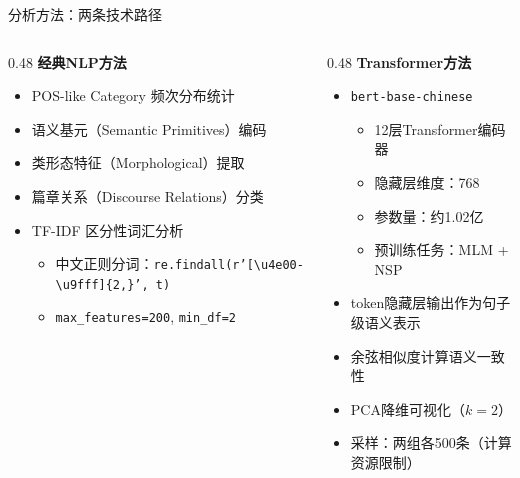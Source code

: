 \documentclass[aspectratio=169,xcolor=x11names,compress]{ctexbeamer}
\begin{document}
\begin{frame}{分析方法：两条技术路径}
\begin{columns}
\begin{column}{0.48\textwidth}
\textbf{经典NLP方法}
\begin{itemize}
    \item POS-like Category 频次分布统计
    \item 语义基元（Semantic Primitives）编码
    \item 类形态特征（Morphological）提取
    \item 篇章关系（Discourse Relations）分类
    \item TF-IDF 区分性词汇分析
    \begin{itemize}
        \item 中文正则分词：\texttt{re.findall(r'[\textbackslash u4e00-\textbackslash u9fff]\{2,\}', t)}
        \item \texttt{max\_features=200}, \texttt{min\_df=2}
    \end{itemize}
\end{itemize}
\end{column}
\begin{column}{0.48\textwidth}
\textbf{Transformer方法}
\begin{itemize}
    \item \texttt{bert-base-chinese}
    \begin{itemize}
        \item 12层Transformer编码器
        \item 隐藏层维度：768
        \item 参数量：约1.02亿
        \item 预训练任务：MLM + NSP
    \end{itemize}
    \item [CLS] token隐藏层输出作为句子级语义表示
    \item 余弦相似度计算语义一致性
    \item PCA降维可视化（$k=2$）
    \item 采样：两组各500条（计算资源限制）
\end{itemize}
\end{column}
\end{columns}
\end{frame}
\end{document}

